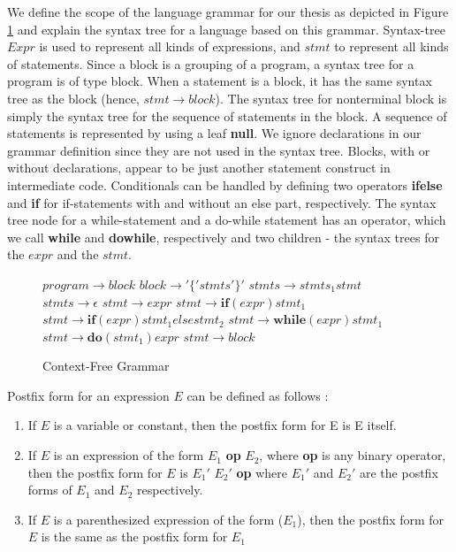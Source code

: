 We define the scope of the language grammar for our thesis as depicted in Figure \ref{fig:grammardef} and explain the syntax tree for a language based on this grammar. Syntax-tree $Expr$ is used to represent all kinds of expressions, and $stmt$ to represent all kinds of statements. Since a block is a grouping of a program, a syntax tree for a program is of type block. When a statement is a block, it has the same syntax tree as the block (hence, $stmt \to block$). The syntax tree for nonterminal block is simply the syntax tree for the sequence of statements in the block. A sequence of statements is represented by using a leaf \textbf{null}. We ignore declarations in our grammar definition since they are not used in the syntax tree. Blocks, with or without declarations, appear to be just another statement construct in intermediate code. Conditionals can be handled by defining two operators \textbf{ifelse} and \textbf{if} for if-statements with and without an else part, respectively. The syntax tree node for a while-statement and a do-while statement has an operator, which we call \textbf{while} and \textbf{dowhile}, respectively and two children - the syntax trees for the $expr$ and the $stmt$. 

\begin{figure}[here]
\begin{algorithmic}
\State $ program \to block$
\State $ block \to '\{' stmts '\}'$
\State $ stmts \to stmts_{1} stmt $
\State $ stmts \to \epsilon$
\State $ stmt \to expr $
\State $ stmt \to \textbf{if} (expr) stmt_{1}$
\State $ stmt \to \textbf{if} (expr) stmt_{1} else stmt_{2} $
\State $ stmt \to \textbf{while} (expr) stmt_{1}$
\State $ stmt \to \textbf{do} (stmt_{1}) expr $
\State $ stmt \to block $
\end{algorithmic}
\caption{Context-Free Grammar}
\label{fig:grammardef}
\end{figure}

\begin{definition}
Postfix form for an expression $E$ can be defined as follows \cite{lam2006compilers}:
\begin{enumerate}
\item If $E$ is a variable or constant, then the postfix form for E is E itself. 
\item If $E$ is an expression of the form $E_{1}$ \textbf{op} $E_{2}$, where \textbf{op} is any binary operator, then the postfix form for $E$ is $E_{1}'$ $E_{2}'$ \textbf{op} where $E_{1}'$ and $E_{2}'$ are the postfix forms of $E_{1}$ and $E_{2}$ respectively. 
\item If $E$ is a parenthesized expression of the form ($E_{1}$), then the postfix form for $E$ is the same as the postfix form for $E_{1}$
\end{enumerate}
\label{def:postfix}
\end{definition}

